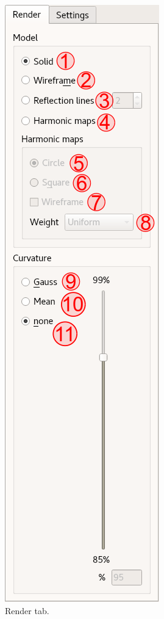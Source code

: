 \documentclass[12pt]{article}
\begin{document}
\begin{figure}
	\begin{subfigure}{0.4\textwidth}
		\centering
		\includegraphics[scale=0.225]{SV-render}
		\caption{Render tab.}
	\end{subfigure}
	\begin{subfigure}{0.4\textwidth}

\end{subfigure}
\end{figure}
\end{document}
